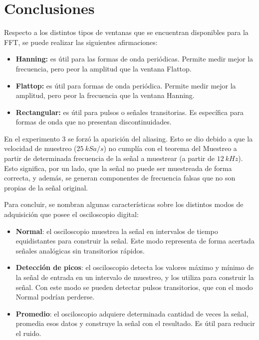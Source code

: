   \pagebreak
  \section{Conclusiones}


  Respecto a los distintos tipos de ventanas que se encuentran disponibles para la FFT, se puede realizar
  las siguientes afirmaciones:

  \begin{itemize}
    \item \textbf{Hanning:} es útil para las formas de onda periódicas. Permite medir mejor la frecuencia, pero peor
      la amplitud que la ventana Flattop.
    \item \textbf{Flattop:} es útil para formas de onda periódica. Permite medir mejor la amplitud, pero peor
      la frecuencia que la ventana Hanning.
    \item \textbf{Rectangular:} es útil para pulsos o señales transitorias. Es específica para formas de onda
      que no presentan discontinuidades.
  \end{itemize}

  En el experimento 3 se forzó la aparición del aliasing. Esto se dio debido a que la velocidad de muestreo ($25~kSa/s$)
  no cumplía con el teorema del Muestreo a partir de determinada frecuencia de la señal a muestrear (a partir de $12~kHz$).
  Esto significa, por un lado, que la señal no puede ser muestreada de forma correcta, y además, se generan componentes
  de frecuencia falsas que no son propias de la señal original.

  Para concluir, se nombran algunas características sobre los distintos modos de adquisición que posee el osciloscopio
  digital:

  \begin{itemize}
    \item \textbf{Normal}: el osciloscopio muestrea la señal en intervalos de tiempo equidistantes para construir la señal. Este
      modo representa de forma acertada señales analógicas sin transitorios rápidos.
    \item \textbf{Detección de picos}: el osciloscopio detecta los valores máximo y mínimo de la señal de entrada en un intervalo
      de muestreo, y los utiliza para construir la señal. Con este modo se pueden detectar pulsos transitorios, que con el
      modo Normal podrían perderse.
    \item \textbf{Promedio}: el osciloscopio adquiere determinada cantidad de veces la señal, promedia esos datos y construye la
      señal con el resultado. Es útil para reducir el ruido.
  \end{itemize}

